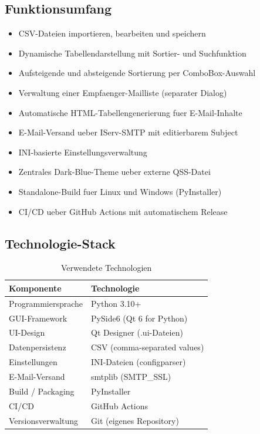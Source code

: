 \documentclass[12pt, a4paper]{article}
\begin{document}
\subsection{Funktionsumfang}

\begin{itemize}[leftmargin=1.5em]
    \item CSV-Dateien importieren, bearbeiten und speichern
    \item Dynamische Tabellendarstellung mit Sortier- und Suchfunktion
    \item Aufsteigende und absteigende Sortierung per ComboBox-Auswahl
    \item Verwaltung einer Empfaenger-Mailliste (separater Dialog)
    \item Automatische HTML-Tabellengenerierung fuer E-Mail-Inhalte
    \item E-Mail-Versand ueber IServ-SMTP mit editierbarem Subject
    \item INI-basierte Einstellungsverwaltung
    \item Zentrales Dark-Blue-Theme ueber externe QSS-Datei
    \item Standalone-Build fuer Linux und Windows (PyInstaller)
    \item CI/CD ueber GitHub Actions mit automatischem Release
\end{itemize}

\subsection{Technologie-Stack}

\begin{table}[ht!]
\centering
{}
\begin{tabularx}{0.85\textwidth}{lX}
\toprule
\textbf{Komponente} & \textbf{Technologie} \\
\midrule
Programmiersprache & Python 3.10+ \\
GUI-Framework & PySide6 (Qt 6 for Python) \\
UI-Design & Qt Designer (.ui-Dateien) \\
Datenpersistenz & CSV (comma-separated values) \\
Einstellungen & INI-Dateien (configparser) \\
E-Mail-Versand & smtplib (SMTP\_SSL) \\
Build / Packaging & PyInstaller \\
CI/CD & GitHub Actions \\
Versionsverwaltung & Git (eigenes Repository) \\
\bottomrule
\end{tabularx}
\caption{Verwendete Technologien}
\end{table}
\end{document}
